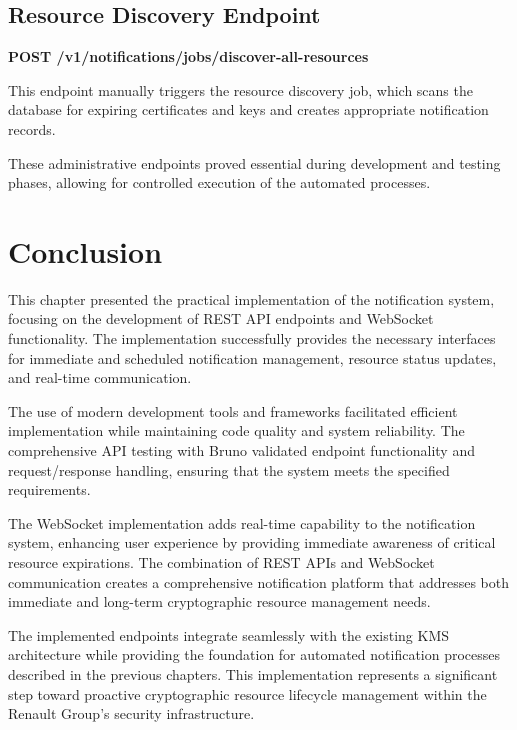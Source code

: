 \subsection{Resource Discovery Endpoint}

\textbf{POST /v1/notifications/jobs/discover-all-resources}

This endpoint manually triggers the resource discovery job, which scans the database for expiring certificates and keys and creates appropriate notification records.

These administrative endpoints proved essential during development and testing phases, allowing for controlled execution of the automated processes.

\section*{Conclusion}

This chapter presented the practical implementation of the notification system, focusing on the development of REST API endpoints and WebSocket functionality. The implementation successfully provides the necessary interfaces for immediate and scheduled notification management, resource status updates, and real-time communication.

The use of modern development tools and frameworks facilitated efficient implementation while maintaining code quality and system reliability. The comprehensive API testing with Bruno validated endpoint functionality and request/response handling, ensuring that the system meets the specified requirements.

The WebSocket implementation adds real-time capability to the notification system, enhancing user experience by providing immediate awareness of critical resource expirations. The combination of REST APIs and WebSocket communication creates a comprehensive notification platform that addresses both immediate and long-term cryptographic resource management needs.

The implemented endpoints integrate seamlessly with the existing KMS architecture while providing the foundation for automated notification processes described in the previous chapters. This implementation represents a significant step toward proactive cryptographic resource lifecycle management within the Renault Group's security infrastructure.